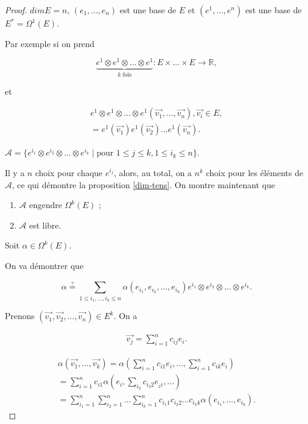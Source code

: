 \documentclass[french]{article}
\begin{document}
\begin{proof}
  $dim E = n$, $(e_1, \dots, e_n)$ est une base de $E$ et $(e ^{1}, \dots, e ^{n})$ est une base de $E ^{*} = \Omega ^{1}(E)$.

  Par exemple si on prend

  \[
  \underbrace{e^{1} \otimes e ^{1} \otimes \dots \otimes e ^{1}}_{k \text{ fois} } : E \times \dots \times E \to \mathbb{R},
  \]

  et

  \begin{gather*}
    e^{1} \otimes e ^{1} \otimes \dots \otimes e ^{1}(\overrightarrow{ v_1 }, \dots, \overrightarrow{ v_n }  ), \overrightarrow{ v_i } \in E, \\
    = e ^{1}(\overrightarrow{ v_1 } ) e ^{1}(\overrightarrow{ v_2 } ) \dots e ^{1}(\overrightarrow{ v_n }).
  \end{gather*}

  $\mathscr{A} = \{ e ^{i_1} \otimes e ^{i_2} \otimes \dots \otimes e ^{i_k} \mid \text{pour } 1 \leq j \leq k, 1 \leq i_k \leq n  \} $.

  Il y a $n$ choix pour chaque $e ^{i_j}$, alors, au total, on a $n ^k$ choix pour les éléments de $\mathscr{A} $, ce qui démontre la proposition \ref{dim-tens}. On montre maintenant que

  \begin{enumerate}
    \item $\mathscr{A} $ engendre $\Omega ^{k}(E)$ ;
    \item $\mathscr{A} $ est libre.
  \end{enumerate}

  Soit $\alpha \in \Omega ^{k}(E)$.

  On va démontrer que

  \[
  \alpha \stackrel{?}{=} \sum_{1 \leq i_1, \dots, i_k \leq n}^{} \alpha(e _{i_1}, e _{i_2}, \dots, e _{i_k}) e ^{i_1} \otimes e ^{i_2} \otimes \dots \otimes e ^{i_k}.
  \]

  Prenons $(\overrightarrow{ v_1 }, \overrightarrow{ v_2 }, \dots, \overrightarrow{ v_n }) \in E ^{k}$. On a

  \begin{gather*}
    \overrightarrow{ v_j } = \sum_{i=1}^{n} c _{ij} e_i.
  \end{gather*}

  \begin{gather*}
    \alpha(\overrightarrow{ v_1 }, \dots, \overrightarrow{ v_k }) = \alpha\left(\sum_{i=1}^{n}c _{i1}e_i, \dots, \sum_{i=1}^{n} c _{ik} e_i\right) \\
    = \sum_{i=1}^{n} c _{i1} \alpha\left(e_i, \sum_{i_2}^{} c _{i_2 2} e _{_2 i}, \dots  \right)  \\
    = \sum_{i_1 =1}^{n} \sum_{i_2=1}^{n} \dots \sum_{i_k=1}^{n} c _{i_1 1} c _{i_2 2} \dots c _{i_k k} \alpha(e _{i_1},\dots, e _{i_k}).
  \end{gather*}


\end{proof}
\end{document}
